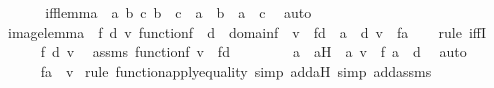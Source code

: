 \begin{isabellebody}
%
\isadelimproof
%
\endisadelimproof
%
\isatagproof
{}\isamarkupfalse%
\ {\isacharminus}{\kern0pt}\ \isanewline
\isanewline
\ \ \isamarkupfalse%
\ iff{\isacharunderscore}{\kern0pt}lemma\ {\isacharcolon}{\kern0pt}\ {\isachardoublequoteopen}{\isasymAnd}a\ b\ c{\isachardot}{\kern0pt}\ b\ {\isacharequal}{\kern0pt}\ c\ {\isasymLongrightarrow}\ a\ {\isacharequal}{\kern0pt}\ b\ {\isasymlongleftrightarrow}\ a\ {\isacharequal}{\kern0pt}\ c{\isachardoublequoteclose}\ \isamarkupfalse%
\ auto\isanewline
\isanewline
\ \ \isamarkupfalse%
\ image{\isacharunderscore}{\kern0pt}lemma\ {\isacharcolon}{\kern0pt}\ {\isachardoublequoteopen}{\isasymAnd}f\ d\ v{\isachardot}{\kern0pt}\ function{\isacharparenleft}{\kern0pt}f{\isacharparenright}{\kern0pt}\ {\isasymLongrightarrow}\ d\ {\isasymsubseteq}\ domain{\isacharparenleft}{\kern0pt}f{\isacharparenright}{\kern0pt}\ {\isasymLongrightarrow}\ v\ {\isasymin}\ f{\isacharbackquote}{\kern0pt}{\isacharbackquote}{\kern0pt}d\ {\isasymlongleftrightarrow}\ {\isacharparenleft}{\kern0pt}{\isasymexists}a\ {\isasymin}\ d{\isachardot}{\kern0pt}\ v\ {\isacharequal}{\kern0pt}\ f{\isacharbackquote}{\kern0pt}a{\isacharparenright}{\kern0pt}{\isachardoublequoteclose}\ \isanewline
\ \ \isamarkupfalse%
{\isacharparenleft}{\kern0pt}rule\ iffI{\isacharparenright}{\kern0pt}\isanewline
\ \ \ \ \isamarkupfalse%
\ f\ d\ v\ \isamarkupfalse%
\ assms{}{\isacharcolon}{\kern0pt}\ {\isachardoublequoteopen}function{\isacharparenleft}{\kern0pt}f{\isacharparenright}{\kern0pt}{\isachardoublequoteclose}\ {\isachardoublequoteopen}v\ {\isasymin}\ f{\isacharbackquote}{\kern0pt}{\isacharbackquote}{\kern0pt}d{\isachardoublequoteclose}\ \isanewline
\ \ \ \ \isamarkupfalse%
\ \isamarkupfalse%
\ a\ \ aH\ {\isacharcolon}{\kern0pt}\ {\isachardoublequoteopen}{\isacharless}{\kern0pt}a{\isacharcomma}{\kern0pt}\ v{\isachargreater}{\kern0pt}\ {\isasymin}\ f{\isachardoublequoteclose}\ {\isachardoublequoteopen}a\ {\isasymin}\ d{\isachardoublequoteclose}\ \isamarkupfalse%
\ auto\ \isanewline
\ \ \ \ \isamarkupfalse%
\ {\isachardoublequoteopen}f{\isacharbackquote}{\kern0pt}a\ {\isacharequal}{\kern0pt}\ v{\isachardoublequoteclose}\ \isamarkupfalse%
{\isacharparenleft}{\kern0pt}rule\ function{\isacharunderscore}{\kern0pt}apply{\isacharunderscore}{\kern0pt}equality{\isacharcomma}{\kern0pt}\ simp\ add{\isacharcolon}{\kern0pt}aH{\isacharcomma}{\kern0pt}\ simp\ add{\isacharcolon}{\kern0pt}assms{}{\isacharparenright}{\kern0pt}\isanewline

\end{isabellebody}
